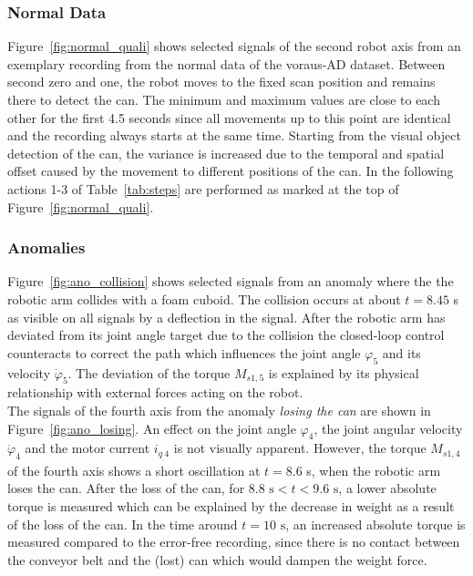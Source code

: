 \documentclass[journal]{IEEEtran}
\newcommand\datasetname{voraus-AD}
\begin{document}
\subsubsection{Normal Data}
Figure~\ref{fig:normal_quali} shows selected signals of the second robot axis from an exemplary recording from the normal data of the \datasetname{} dataset.
Between second zero and one, the robot moves to the fixed scan position and remains there to detect the can.
The minimum and maximum values are close to each other for the first 4.5 seconds since all movements up to this point are identical and the recording always starts at the same time.
Starting from the visual object detection of the can, the variance is increased due to the temporal and spatial offset caused by the movement to different positions of the can.
In the following actions {1-3} of Table~\ref{tab:steps} are performed as marked at the top of Figure~\ref{fig:normal_quali}.

\subsubsection{Anomalies}
Figure~\ref{fig:ano_collision} shows selected signals from an anomaly where the the robotic arm collides with a foam cuboid.
The collision occurs at about $t = 8.45$ s as visible on all signals by a deflection in the signal.
After the robotic arm has deviated from its joint angle target due to the collision the closed-loop control counteracts to correct the path which influences the joint angle $\varphi_5$ and its velocity $\dot{\varphi}_5$.
The deviation of the torque $M_{s1,5}$ is explained by its physical relationship with external forces acting on the robot.
\\The signals of the fourth axis from the anomaly \textit{losing the can} are shown in Figure~\ref{fig:ano_losing}.
An effect on the joint angle $\varphi_4$, the joint angular velocity $\dot{\varphi}_4$ and the motor current $i_{q_,4}$ is not visually apparent.
However, the torque $M_{s1,4}$ of the fourth axis shows a short oscillation at $t = 8.6 $ s, when the robotic arm loses the can.
After the loss of the can, for {$8.8\text{ s} < t < 9.6\text{ s}$}, a lower absolute torque is measured which can be explained by the decrease in weight as a result of the loss of the can.
In the time around {$t = 10\text{ s}$}, an increased absolute torque is measured compared to the error-free recording, since there is no contact between the conveyor belt and the (lost) can which would dampen the weight force.
\end{document}

